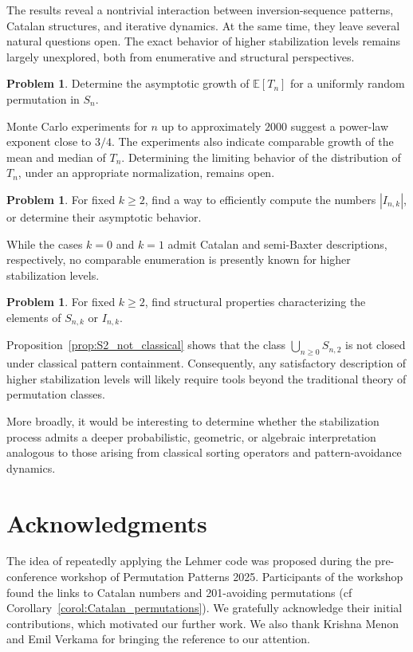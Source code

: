 \documentclass[11pt]{article}
\theoremstyle{remark}
\theoremstyle{definition}
\newtheorem{problem}[thm]{Problem}
\begin{document}
The results reveal a nontrivial interaction between inversion-sequence patterns, Catalan structures, and iterative dynamics. At the same time, they leave several natural questions open. The exact behavior of higher stabilization levels remains largely unexplored, both from enumerative and structural perspectives.

\begin{problem}\label{prob:average_growth}
Determine the asymptotic growth of $\mathbb{E}[T_n]$ for a uniformly
random permutation in $S_n$.
\end{problem}

Monte Carlo experiments for $n$ up to approximately $2000$ suggest a
power-law exponent close to $3/4$. The experiments also indicate
comparable growth of the mean and median of $T_n$. Determining the
limiting behavior of the distribution of $T_n$, under an appropriate
normalization, remains open.

\begin{problem}\label{prob:higher_generating}
For fixed $k\geq2$, find a way to efficiently compute the numbers $|I_{n,k}|$, or determine their asymptotic behavior.
\end{problem}

While the cases $k=0$ and $k=1$ admit Catalan and semi-Baxter descriptions, respectively, no comparable enumeration is presently known for higher stabilization levels.

\begin{problem}\label{prob:higher_intrinsic}
For fixed $k\geq2$, find structural properties characterizing the elements of $S_{n,k}$ or $I_{n,k}$.
\end{problem}

Proposition~\ref{prop:S2_not_classical} shows that the class $\bigcup_{n\geq0}S_{n,2}$ is not closed under classical pattern containment. Consequently, any satisfactory description of higher stabilization levels will likely require tools beyond the traditional theory of permutation classes.

More broadly, it would be interesting to determine whether the stabilization process admits a deeper probabilistic, geometric, or algebraic interpretation analogous to those arising from classical sorting operators and pattern-avoidance dynamics.

\section*{Acknowledgments}
The idea of repeatedly applying the Lehmer code was proposed during the pre-conference workshop of Permutation Patterns 2025. Participants of the workshop found the links to Catalan numbers and 201-avoiding permutations (cf Corollary~\ref{corol:Catalan_permutations}). We gratefully acknowledge their initial contributions, which motivated our further work. We also thank Krishna Menon and Emil Verkama for bringing the reference \cite{Sunik_2003} to our attention.
\end{document}
